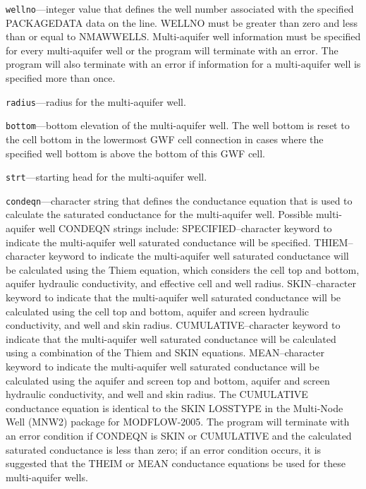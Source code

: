 \begin{description}
\item \texttt{wellno}---integer value that defines the well number associated with the specified PACKAGEDATA data on the line. WELLNO must be greater than zero and less than or equal to NMAWWELLS. Multi-aquifer well information must be specified for every multi-aquifer well or the program will terminate with an error.  The program will also terminate with an error if information for a multi-aquifer well is specified more than once.

\item \texttt{radius}---radius for the multi-aquifer well.

\item \texttt{bottom}---bottom elevation of the multi-aquifer well. The well bottom is reset to the cell bottom in the lowermost GWF cell connection in cases where the specified well bottom is above the bottom of this GWF cell.

\item \texttt{strt}---starting head for the multi-aquifer well.

\item \texttt{condeqn}---character string that defines the conductance equation that is used to calculate the saturated conductance for the multi-aquifer well. Possible multi-aquifer well CONDEQN strings include: SPECIFIED--character keyword to indicate the multi-aquifer well saturated conductance will be specified.  THIEM--character keyword to indicate the multi-aquifer well saturated conductance will be calculated using the Thiem equation, which considers the cell top and bottom, aquifer hydraulic conductivity, and effective cell and well radius.  SKIN--character keyword to indicate that the multi-aquifer well saturated conductance will be calculated using the cell top and bottom, aquifer and screen hydraulic conductivity, and well and skin radius.  CUMULATIVE--character keyword to indicate that the multi-aquifer well saturated conductance will be calculated using a combination of the Thiem and SKIN equations.  MEAN--character keyword to indicate the multi-aquifer well saturated conductance will be calculated using the aquifer and screen top and bottom, aquifer and screen hydraulic conductivity, and well and skin radius. The CUMULATIVE conductance equation is identical to the SKIN LOSSTYPE in the Multi-Node Well (MNW2) package for MODFLOW-2005. The program will terminate with an error condition if CONDEQN is SKIN or CUMULATIVE and the calculated saturated conductance is less than zero; if an error condition occurs, it is suggested that the THEIM or MEAN conductance equations be used for these multi-aquifer wells.


\end{description}
